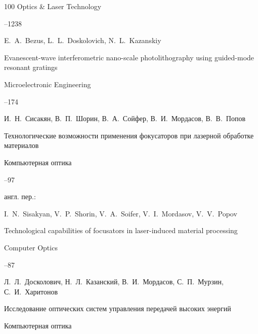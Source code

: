 \begin{thebibliography}{100}
\jour Optics \& Laser Technology




--1238




\by E.~A.~Bezus, L.~L.~Doskolovich, N.~L.~Kazanskiy

\paper Evanescent-wave interferometric nano-scale photolithography using guided-mode resonant gratings

\jour  Microelectronic Engineering




--174




\by И.~Н.~Сисакян, В.~П.~Шорин, В.~А.~Сойфер, В.~И.~Мордасов, В.~В.~Попов

\paper Технологические возможности применения фокусаторов при лазерной обработке материалов

\jour Компьютерная оптика



--97

\transl англ. пер.:~

\by I.~N.~Sisakyan, V.~P.~Shorin, V.~A.~Soifer, V.~I.~Mordasov, V.~V.~Popov

\paper Technological capabilities of focusators in  laser-induced material processing

\jour Computer Optics




--87








\by Л.~Л.~Досколович, Н.~Л.~Казанский, В.~И.~Мордасов, С.~П.~Мурзин, С.~И.~Харитонов

\paper Исследование оптических систем управления передачей высоких энергий

\jour Компьютерная оптика




\end{thebibliography}

